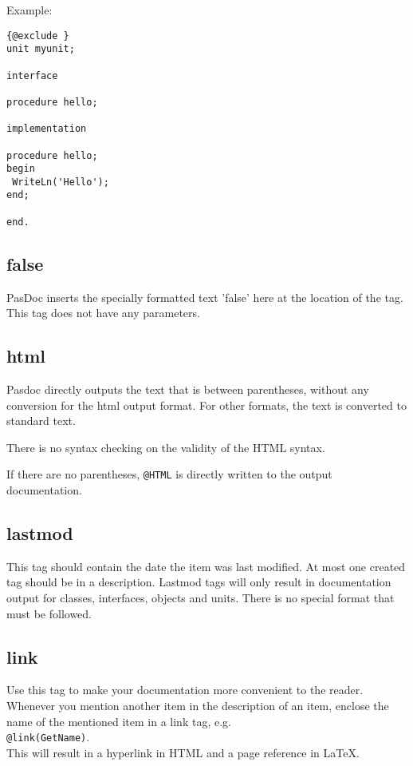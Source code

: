 \documentclass[11pt]{article}
\begin{document}
Example:
\begin{verbatim}
{@exclude }
unit myunit;

interface

procedure hello;

implementation

procedure hello;
begin
 WriteLn('Hello');
end;

end.
\end{verbatim}


\subsection{false}
PasDoc inserts the specially formatted text 'false' here
at the location of the tag. This tag does not have any
parameters.

\subsection{html}
Pasdoc directly outputs the text that is between parentheses,
without any conversion for the html output format. For other 
formats, the text is converted to standard text. 

There is no syntax checking on the validity of the HTML syntax.

If there are no parentheses, {\tt @HTML} is directly written
to the output documentation.

\subsection{lastmod}

This tag should contain the date the item was last modified.
At most one created tag should be in a description.
Lastmod tags will only result in documentation output for
classes, interfaces, objects and units.
There is no special format that must be followed.

\subsection{link}

Use this tag to make your documentation more convenient to the reader.
Whenever you mention another item in the description of an item,
enclose the name of the mentioned item in a link tag, e.g.\\
{\tt @link(GetName)}.\\
This will result in a hyperlink in HTML and a page reference in
\LaTeX.
\end{document}
